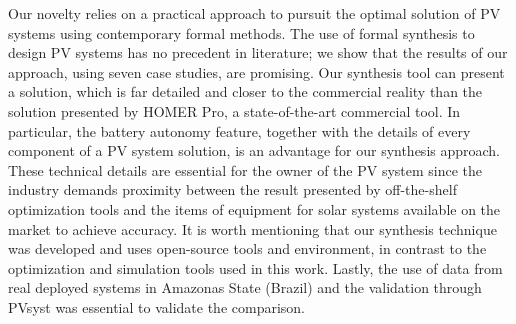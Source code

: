 \documentclass[runningheads]{llncs}
\begin{document}
Our novelty relies on a practical approach to pursuit the optimal solution of PV systems using contemporary formal methods. The use of formal synthesis to design PV systems has no precedent in literature; we show that the results of our approach, using seven case studies, are promising. Our synthesis tool can present a solution, which is far detailed and closer to the commercial reality than the solution presented by HOMER Pro, a state-of-the-art commercial tool. In particular, the battery autonomy feature, together with the details of every component of a PV system solution, is an advantage for our synthesis approach. These technical details are essential for the owner of the PV system since the industry demands proximity between the result presented by off-the-shelf optimization tools and the items of equipment for solar systems available on the market to achieve accuracy. It is worth mentioning that our synthesis technique was developed and uses open-source tools and environment, in contrast to the optimization and simulation tools used in this work. Lastly, the use of data from real deployed systems in Amazonas State (Brazil) and the validation through PVsyst was essential to validate the comparison.

%
%


%
\end{document}
